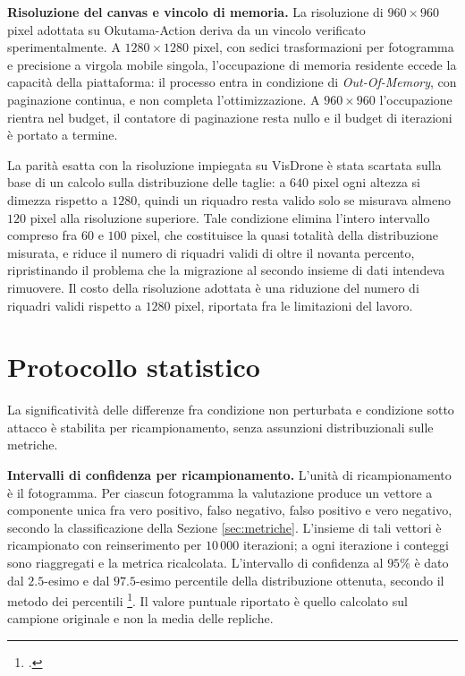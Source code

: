 \documentclass[a4paper,12pt]{report}
\begin{document}
\textbf{Risoluzione del canvas e vincolo di memoria.}
\label{sec:risoluzione}
La risoluzione di $960 \times 960$ pixel adottata su Okutama-Action deriva da un
vincolo verificato sperimentalmente. A $1280 \times 1280$ pixel, con sedici
trasformazioni per fotogramma e precisione a virgola mobile singola,
l'occupazione di memoria residente eccede la capacità della piattaforma: il
processo entra in condizione di \textit{Out-Of-Memory}, con paginazione
continua, e non completa l'ottimizzazione. A $960 \times 960$ l'occupazione
rientra nel budget, il contatore di paginazione resta nullo e il budget di
iterazioni è portato a termine.

La parità esatta con la risoluzione impiegata su VisDrone è stata scartata sulla
base di un calcolo sulla distribuzione delle taglie: a $640$ pixel ogni altezza
si dimezza rispetto a $1280$, quindi un riquadro resta valido solo se misurava
almeno $120$ pixel alla risoluzione superiore. Tale condizione elimina l'intero
intervallo compreso fra $60$ e $100$ pixel, che costituisce la quasi totalità
della distribuzione misurata, e riduce il numero di riquadri validi di oltre il
novanta percento, ripristinando il problema che la migrazione al secondo insieme
di dati intendeva rimuovere. Il costo della risoluzione adottata è una riduzione
del numero di riquadri validi rispetto a $1280$ pixel, riportata fra le
limitazioni del lavoro.

\section{Protocollo statistico}
\label{sec:protocollo}

La significatività delle differenze fra condizione non perturbata e condizione
sotto attacco è stabilita per ricampionamento, senza assunzioni distribuzionali
sulle metriche.

\textbf{Intervalli di confidenza per ricampionamento.}
\label{sec:bootstrap}
L'unità di ricampionamento è il fotogramma. Per ciascun fotogramma la
valutazione produce un vettore a componente unica fra vero positivo, falso
negativo, falso positivo e vero negativo, secondo la classificazione della
Sezione \ref{sec:metriche}. L'insieme di tali vettori è ricampionato con
reinserimento per $10\,000$ iterazioni; a ogni iterazione i conteggi sono
riaggregati e la metrica ricalcolata. L'intervallo di confidenza al $95\%$ è
dato dal $2.5$-esimo e dal $97.5$-esimo percentile della distribuzione ottenuta,
secondo il metodo dei percentili \footcite{efron_1993_bootstrap}. Il valore
puntuale riportato è quello calcolato sul campione originale e non la media
delle repliche.
\end{document}
